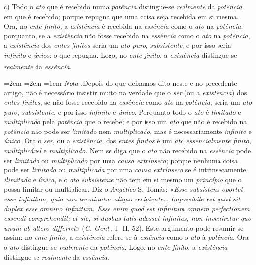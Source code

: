 \documentclass[12pt,a4paper]{article}
\newcommand{\subp}[1]{\medskip\noindent#1)\quad}
\renewcommand\footnote[1]{%
    \stepcounter{footnote}\textsuperscript{\thefootnote}%
    \par
    {\footnotesize
     \leftskip=2em \rightskip=2em \parindent=1em
     \addvspace{\medskipamount}%
     \noindent\textit{Nota \thefootnote.}\enspace #1\par
     \addvspace{\medskipamount}}%
  }
\begin{document}
\subp{c} Todo o \emph{ato} que é recebido numa \emph{potência} distingue-se
\emph{realmente} da \emph{potência} em que é recebido; porque repugna que uma
coisa seja recebida em si mesma. Ora, no \emph{ente finito}, a \emph{existência}
é recebida na \emph{essência} como o \emph{ato} na \emph{potência}; porquanto,
se a \emph{existência} não fosse recebida na \emph{essência} como o \emph{ato}
na \emph{potência}, a \emph{existência} dos \emph{entes finitos} seria um
\emph{ato puro}, \emph{subsistente}, e por isso seria \emph{infinito} e
\emph{único}: o que repugna. Logo, no \emph{ente finito}, a \emph{existência}
distingue-se \emph{realmente} da \emph{essência}.\footnote{Depois do que
deixamos dito neste e no precedente artigo, não é necessário insistir muito na
verdade \textemdash{} que o \emph{ser} (ou a \emph{existência}) dos \emph{entes
finitos}, se não fosse recebido na \emph{essência} como \emph{ato} na
\emph{potência}, seria um \emph{ato puro}, \emph{subsistente}, e por isso
\emph{infinito} e \emph{único}. Porquanto todo o \emph{ato} é \emph{limitado} e
\emph{multiplicado} pela \emph{potência} que o recebe; e por isso um \emph{ato}
que não é recebido na \emph{potência} não pode ser \emph{limitado} nem
\emph{multiplicado}, mas é necessariamente \emph{infinito} e \emph{único}. Ora
o \emph{ser}, ou a \emph{existência}, dos \emph{entes finitos} é um \emph{ato
essencialmente finito}, \emph{multiplicável} e \emph{multiplicado}.
\textemdash{} Nem se diga que o \emph{ato} não recebido na \emph{essência} pode
ser \emph{limitado} ou \emph{multiplicado} por uma \emph{causa extrínseca};
porque nenhuma coisa pode ser \emph{limitada} ou \emph{multiplicada} por uma
\emph{causa extrínseca} se é intrinsecamente \emph{ilimitada} e \emph{única}, e
o \emph{ato subsistente} não tem em si mesmo um \emph{princípio} que o possa
limitar ou multiplicar. Diz o \emph{Angélico} S. Tomás: «\textit{Esse
subsistens oportet esse infinitum, quia non terminatur aliquo recipiente\dots{}
Impossibile est quod sit duplex esse omnino infinitum. Esse enim quod est
infinitum omnem perfectionem essendi comprehendit; et sic, si duobus talis
adesset infinitas, non inveniretur quo unum ab altero differret}» (\emph{C.
Gent.}, l.~II, 52). \textemdash{} Este argumento pode resumir-se assim: no
\emph{ente finito}, a \emph{existência} refere-se à \emph{essência} como o
\emph{ato} à \emph{potência}. Ora o \emph{ato} distingue-se \emph{realmente} da
\emph{potência}. Logo, no \emph{ente finito}, a \emph{existência} distingue-se
\emph{realmente} da \emph{essência}.

}
\end{document}
